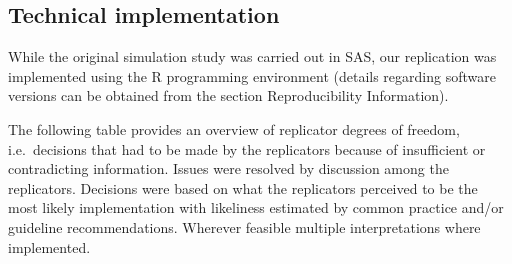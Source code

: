 \documentclass[10,a4paperpaper,]{article}
\begin{document}
\subsection{Technical implementation}

While the original simulation study was carried out in SAS, our
replication was implemented using the R programming environment (details
regarding software versions can be obtained from the section
Reproducibility Information).

The following table provides an overview of replicator degrees of
freedom, i.e.~decisions that had to be made by the replicators because
of insufficient or contradicting information. Issues were resolved by
discussion among the replicators. Decisions were based on what the
replicators perceived to be the most likely implementation with
likeliness estimated by common practice and/or guideline
recommendations. Wherever feasible multiple interpretations where
implemented.
\end{document}
